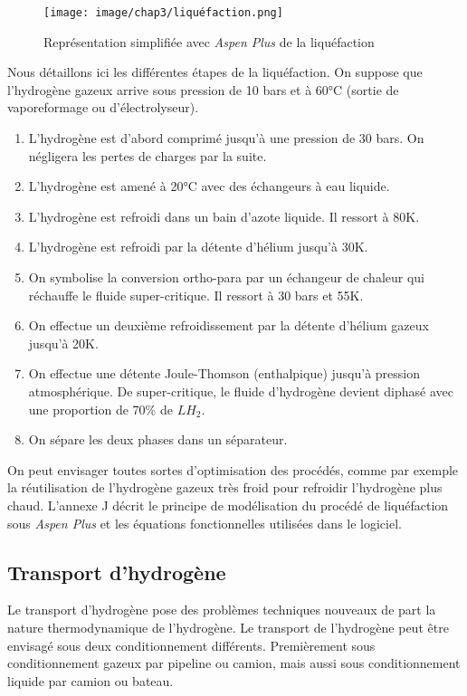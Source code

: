 \documentclass[11pt,french,a4paper]{article}
\begin{document}
\begin{figure}[h!]
\centering
\texttt{[image: image/chap3/liquéfaction.png]}
\caption{Représentation simplifiée avec \textit{Aspen Plus} de la liquéfaction}
\end{figure}

Nous détaillons ici les différentes étapes de la liquéfaction. On suppose que l'hydrogène gazeux arrive sous pression de 10 bars et à 60°C (sortie de vaporeformage ou d'électrolyseur).
\begin{enumerate}
\item L'hydrogène est d'abord comprimé jusqu'à une pression de 30 bars. On négligera les pertes de charges par la suite.
\item L'hydrogène est amené à 20°C avec des échangeurs à eau liquide.
\item L'hydrogène est refroidi dans un bain d'azote liquide. Il ressort à 80K.
\item L'hydrogène est refroidi par la détente d'hélium jusqu'à 30K.
\item On symbolise la conversion ortho-para par un échangeur de chaleur qui réchauffe le fluide super-critique. Il ressort à 30 bars et 55K.
\item On effectue un deuxième refroidissement par la détente d'hélium gazeux jusqu'à 20K.
\item On effectue une détente Joule-Thomson (enthalpique) jusqu'à pression atmosphérique. De super-critique, le fluide d'hydrogène devient diphasé avec une proportion de 70\% de $LH_2$.
\item On sépare les deux phases dans un séparateur.
\end{enumerate}

On peut envisager toutes sortes d'optimisation des procédés, comme par exemple la réutilisation de l'hydrogène gazeux très froid pour refroidir l'hydrogène plus chaud. L'annexe J décrit le principe de modélisation du procédé de liquéfaction sous \textit{Aspen Plus} et les équations fonctionnelles utilisées dans le logiciel.


\subsection{Transport d'hydrogène}
Le transport d'hydrogène pose des problèmes techniques nouveaux de part la nature thermodynamique de l'hydrogène. Le transport de l’hydrogène peut être envisagé sous deux conditionnement différents. Premièrement sous conditionnement gazeux par pipeline ou camion, mais aussi sous conditionnement liquide par camion ou bateau.
\end{document}
